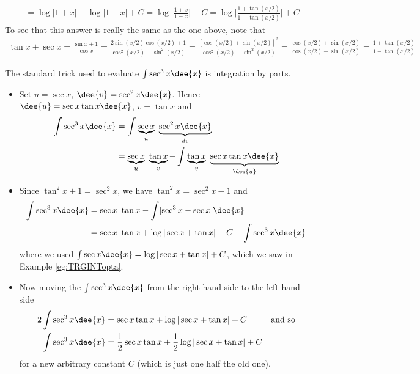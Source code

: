 \begin{eg}[$\int \csc x\dee{x}$ --- by the $u=\tan\frac{x}{2}$ substitution]
\begin{itemize}
{\begin{align*}
&=\log|1+x|-\log|1-x|+C
=\log\big|\frac{1+x}{1-x}\big|+C
=\log\big|\frac{1+\tan(x/2)}{1-\tan(x/2)}\big|+C
\end{align*}
To see that this answer is really the same as the one above, note that
\begin{align*}
\tan x+\sec x
=\frac{\sin x+1}{\cos x}
=\frac{2\sin(x/2)\cos(x/2)+1}{\cos^2 (x/2)-\sin^2(x/2)}
=\frac{[\cos(x/2)+\sin(x/2)]^2}{\cos^2 (x/2)-\sin^2(x/2)}
=\frac{\cos(x/2)+\sin(x/2)}{\cos (x/2)-\sin(x/2)}
=\frac{1+\tan(x/2)}{1-\tan(x/2)}
\end{align*}
} %

\end{itemize}
\end{eg}

\begin{eg}\label{eg:TRGINToptd}
\soln The standard trick used to evaluate $\int \sec^3 x\dee{x}$ is integration by
parts.
\begin{itemize}
 \item Set $u=\sec x$, $\dee{v}=\sec^2 x\dee{x}$. Hence $\dee{u}=\sec x\tan x\dee{x}$,
$v=\tan x$ and
\begin{align*}
\int \sec^3 x\dee{x}
&=\int \underbrace{\sec x}_{u}\ \underbrace{\sec^2 x\dee{x}}_{dv} \\
&=\underbrace{\sec x}_{u}\ \underbrace{\tan x}_{v}
         -\int \underbrace{\tan x}_{v}\ \underbrace{\sec x\tan x\dee{x}}_{\dee{u}}
\end{align*}
\item Since $\tan^2 x+1=\sec^2 x$, we have $\tan^2 x=\sec^2 x-1$ and
\begin{align*}
\int \sec^3 x\dee{x}
&=\sec x\ \tan x -\int [\sec^3 x-\sec x]\dee{x} \\
&=\sec x\ \tan x +\log|\sec x+\tan x|+C -\int \sec^3 x\dee{x}
\end{align*}
where we used $\int \sec x\dee{x} = \log|\sec x+\tan x|+C$, which
we saw in Example \ref{eg:TRGINTopta}.
\item Now moving the $\int \sec^3 x\dee{x}$ from the right hand side to the left hand side
\begin{align*}
2\int \sec^3 x\dee{x}
&=\sec x\tan x +\log|\sec x+\tan x|+C & \text{and so}\\
\int \sec^3 x\dee{x}
&=\frac{1}{2} \sec x\tan x +\frac{1}{2}\log|\sec x+\tan x|+C
\end{align*}
for a new arbitrary constant $C$ (which is just one half the old one).
\end{itemize}
\end{eg}

